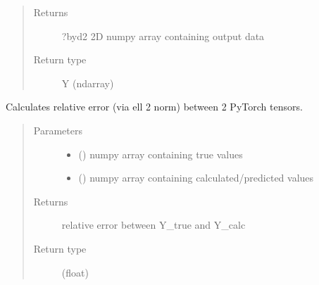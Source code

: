 \documentclass[letterpaper,10pt,english]{sphinxmanual}
\begin{document}
\begin{fulllineitems}
\begin{fulllineitems}
\begin{quote}
\begin{description}
\item[{Returns}] \leavevmode
\sphinxAtStartPar
?\sphinxhyphen{}by\sphinxhyphen{}d2 2D numpy array containing output data

\item[{Return type}] \leavevmode
\sphinxAtStartPar
Y (ndarray)

\end{description}\end{quote}

\end{fulllineitems}


\begin{fulllineitems}
\label{\detokenize{rom:rom.response_surfaces.NN_alt.rel_error_tensor}}
\sphinxAtStartPar
Calculates relative error (via ell 2 norm) between 2 PyTorch tensors.
\begin{quote}\begin{description}
\item[{Parameters}] \leavevmode\begin{itemize}
\item {} 
\sphinxAtStartPar
{} () \textendash{} numpy array containing true values

\item {} 
\sphinxAtStartPar
{} () \textendash{} numpy array containing calculated/predicted values

\end{itemize}

\item[{Returns}] \leavevmode
\sphinxAtStartPar
relative error between Y\_true and Y\_calc

\item[{Return type}] \leavevmode
\sphinxAtStartPar
(float)

\end{description}\end{quote}

\end{fulllineitems}



\end{fulllineitems}
\end{document}
